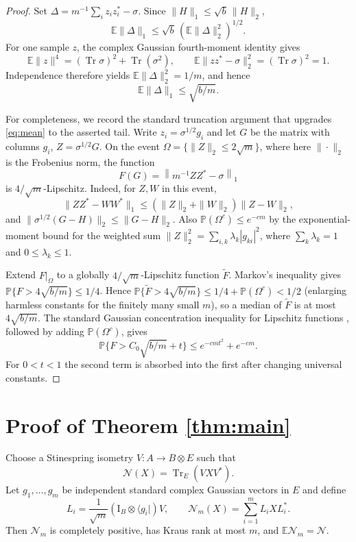 \documentclass[11pt]{article}
\newcommand{\Tr}{\operatorname{Tr}}
\newcommand{\Id}{\mathrm I}
\newcommand{\E}{\mathbb E}
\newcommand{\Pp}{\mathbb P}
\begin{document}
\begin{proof}
Set $\Delta=m^{-1}\sum_i z_i z_i^*-\sigma$.  Since $\|H\|_1\leq\sqrt b\,\|H\|_2$,
\[
\E\|\Delta\|_1
\leq \sqrt b\,(\E\|\Delta\|_2^2)^{1/2}.
\]
For one sample $z$, the complex Gaussian fourth-moment identity gives
\[
\E\|z\|^4=(\Tr\sigma)^2+\Tr(\sigma^2),
\qquad
\E\|zz^*-\sigma\|_2^2=(\Tr\sigma)^2=1.
\]
Independence therefore yields $\E\|\Delta\|_2^2=1/m$, and hence
\begin{equation}\label{eq:mean}
\E\|\Delta\|_1\leq\sqrt{b/m}.
\end{equation}

For completeness, we record the standard truncation argument that upgrades
\eqref{eq:mean} to the asserted tail.  Write $z_i=\sigma^{1/2}g_i$ and let
$G$ be the matrix with columns $g_i$, $Z=\sigma^{1/2}G$.  On the event
$\Omega=\{\|Z\|_2\leq2\sqrt m\}$, where here $\|\cdot\|_2$ is the Frobenius norm, the function
\[
F(G)=\left\|m^{-1}ZZ^*-\sigma\right\|_1
\]
is $4/\sqrt m$-Lipschitz.  Indeed, for $Z,W$ in this event,
\[
\|ZZ^*-WW^*\|_1
\leq(\|Z\|_2+\|W\|_2)\|Z-W\|_2,
\]
and $\|\sigma^{1/2}(G-H)\|_2\leq\|G-H\|_2$.
Also $\Pp(\Omega^c)\leq e^{-cm}$ by the exponential-moment bound for the weighted sum
$\|Z\|_2^2=\sum_{i,k}\lambda_k|g_{ki}|^2$, where $\sum_k\lambda_k=1$ and $0\leq\lambda_k\leq1$.

Extend $F|_\Omega$ to a globally $4/\sqrt m$-Lipschitz function $\widetilde F$.  Markov's inequality gives $\Pp\{F>4\sqrt{b/m}\}\leq1/4$.  Hence
$\Pp\{\widetilde F>4\sqrt{b/m}\}\leq1/4+\Pp(\Omega^c)<1/2$ (enlarging harmless constants for the finitely many small $m$), so a median of $\widetilde F$ is at most $4\sqrt{b/m}$.  The standard Gaussian concentration inequality for Lipschitz functions \cite[Chapter 5]{BLM}, followed by adding $\Pp(\Omega^c)$, gives
\[
\Pp\{F>C_0\sqrt{b/m}+t\}
\leq e^{-cmt^2}+e^{-cm}.
\]
For $0<t<1$ the second term is absorbed into the first after changing universal constants.
\end{proof}

\section{Proof of Theorem \ref{thm:main}}

Choose a Stinespring isometry $V:A\to B\otimes E$ such that
\[
\mathcal N(X)=\Tr_E(VXV^*).
\]
Let $g_1,\ldots,g_m$ be independent standard complex Gaussian vectors in $E$ and define
\[
L_i=\frac1{\sqrt m}(\Id_B\otimes\langle g_i|)V,
\qquad
\mathcal N_m(X)=\sum_{i=1}^mL_iXL_i^*.
\]
Then $\mathcal N_m$ is completely positive, has Kraus rank at most $m$, and $\E\mathcal N_m=\mathcal N$.
\end{document}
